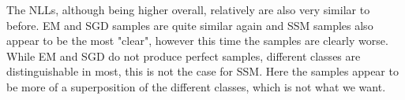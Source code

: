 The NLLs, although being higher overall, relatively are also very similar to before. 
EM and SGD samples are quite similar again and SSM samples also appear to be the most "clear", 
however this time the samples are clearly worse. While EM and SGD do not 
produce perfect samples, different classes are distinguishable in most, this is not the case for SSM. 
Here the samples appear to be more of a superposition of the different classes, which is not what we want.